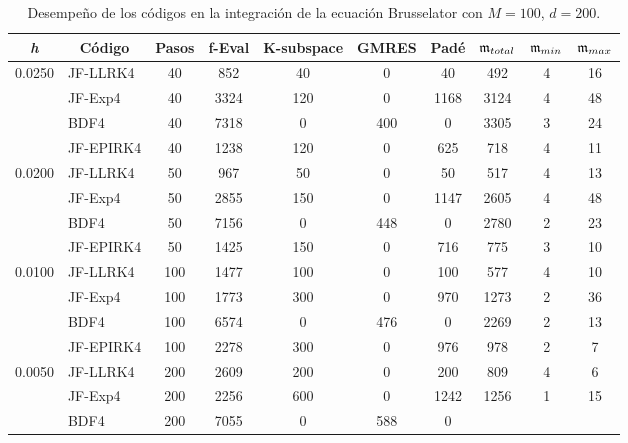 \begin{table}[htb]
	\caption{Desempeño de los códigos en la integración de la ecuación Brusselator con $M=100$, $d=200$.}
	\centering
	\begin{adjustbox}{width=0.9\columnwidth,center}
		\begin{tabular}{cccccccccc}
			\hline
			\textit{h} & Código & Pasos & f-Eval & K-subspace & GMRES & Padé & $\mathfrak{m}_{total}$ & $\mf%
			_{min}$ & $\mathfrak{m}_{max}$ \\ \hline
			\multicolumn{1}{l}{0.0250} & \multicolumn{1}{l}{JF-LLRK4} & 40 & 852 & 40 &
			0 & 40 & 492 & 4 & 16 \\
			\multicolumn{1}{l}{} & \multicolumn{1}{l}{JF-Exp4} & 40 & 3324 & 120 & 0 &
			1168 & 3124 & 4 & 48 \\
			\multicolumn{1}{l}{} & \multicolumn{1}{l}{BDF4} & 40 & 7318 & 0 & 400 & 0 &
			3305 & 3 & 24 \\
			\multicolumn{1}{l}{} & \multicolumn{1}{l}{JF-EPIRK4} & 40 & 1238 & 120 & 0 &
			625 & 718 & 4 & 11 \\
			\multicolumn{1}{l}{0.0200} & \multicolumn{1}{l}{JF-LLRK4} & 50 & 967 & 50 &
			0 & 50 & 517 & 4 & 13 \\
			\multicolumn{1}{l}{} & \multicolumn{1}{l}{JF-Exp4} & 50 & 2855 & 150 & 0 &
			1147 & 2605 & 4 & 48 \\
			\multicolumn{1}{l}{} & \multicolumn{1}{l}{BDF4} & 50 & 7156 & 0 & 448 & 0 &
			2780 & 2 & 23 \\
			\multicolumn{1}{l}{} & \multicolumn{1}{l}{JF-EPIRK4} & 50 & 1425 & 150 & 0 &
			716 & 775 & 3 & 10 \\
			\multicolumn{1}{l}{0.0100} & \multicolumn{1}{l}{JF-LLRK4} & 100 & 1477 & 100
			& 0 & 100 & 577 & 4 & 10 \\
			\multicolumn{1}{l}{} & \multicolumn{1}{l}{JF-Exp4} & 100 & 1773 & 300 & 0 &
			970 & 1273 & 2 & 36 \\
			\multicolumn{1}{l}{} & \multicolumn{1}{l}{BDF4} & 100 & 6574 & 0 & 476 & 0 &
			2269 & 2 & 13 \\
			\multicolumn{1}{l}{} & \multicolumn{1}{l}{JF-EPIRK4} & 100 & 2278 & 300 & 0 &
			976 & 978 & 2 & 7 \\
			\multicolumn{1}{l}{0.0050} & \multicolumn{1}{l}{JF-LLRK4} & 200 & 2609 & 200
			& 0 & 200 & 809 & 4 & 6 \\
			\multicolumn{1}{l}{} & \multicolumn{1}{l}{JF-Exp4} & 200 & 2256 & 600 & 0 &
			1242 & 1256 & 1 & 15 \\
			\multicolumn{1}{l}{} & \multicolumn{1}{l}{BDF4} & 200 & 7055 & 0 & 588 & 0 &

\end{tabular}
\end{adjustbox}
\end{table}
